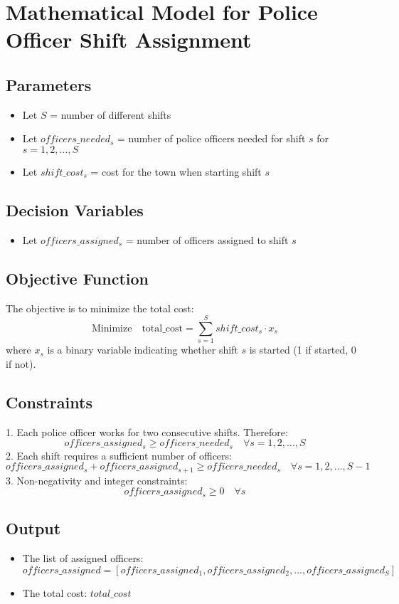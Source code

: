 \documentclass{article}
\begin{document}
\section*{Mathematical Model for Police Officer Shift Assignment}

\subsection*{Parameters}
\begin{itemize}
    \item Let \( S \) = number of different shifts
    \item Let \( officers\_needed_{s} \) = number of police officers needed for shift \( s \) for \( s = 1, 2, \ldots, S \)
    \item Let \( shift\_cost_{s} \) = cost for the town when starting shift \( s \)
\end{itemize}

\subsection*{Decision Variables}
\begin{itemize}
    \item Let \( officers\_assigned_{s} \) = number of officers assigned to shift \( s \)
\end{itemize}

\subsection*{Objective Function}
The objective is to minimize the total cost:
\[
\text{Minimize} \quad \text{total\_cost} = \sum_{s=1}^{S} shift\_cost_{s} \cdot x_{s}
\]
where \( x_{s} \) is a binary variable indicating whether shift \( s \) is started (1 if started, 0 if not). 

\subsection*{Constraints}
1. Each police officer works for two consecutive shifts. Therefore:
   \[
   officers\_assigned_{s} \geq officers\_needed_{s} \quad \forall s = 1, 2, \ldots, S
   \]
2. Each shift requires a sufficient number of officers:
   \[
   officers\_assigned_{s} + officers\_assigned_{s+1} \geq officers\_needed_{s} \quad \forall s = 1, 2, \ldots, S-1
   \]
3. Non-negativity and integer constraints:
   \[
   officers\_assigned_{s} \geq 0 \quad \forall s
   \]

\subsection*{Output}
\begin{itemize}
    \item The list of assigned officers: \( officers\_assigned = [officers\_assigned_{1}, officers\_assigned_{2}, ..., officers\_assigned_{S}] \)
    \item The total cost: \( total\_cost \)
\end{itemize}
\end{document}
